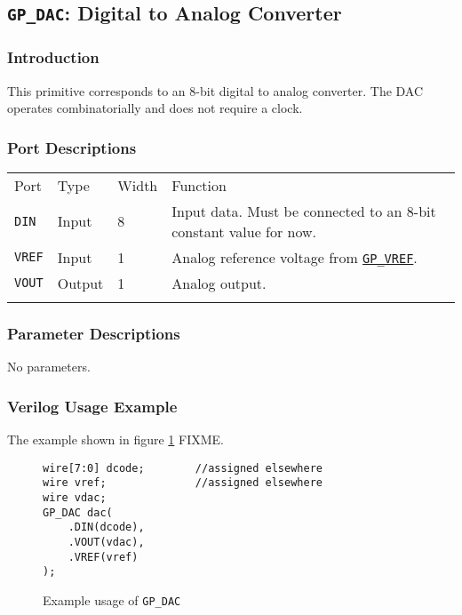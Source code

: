 \documentclass[11pt]{article}
\newcommand{\tokenstyle}[1]{\texttt{#1}}
\newcommand{\whenstyle}[1]{{\fontseries{sb}\selectfont#1}}
\newcommand{\tokenref}[2]{\hyperref[#2]{\tokenstyle{#1}}}
\newcommand{\thinhline}{\Xhline{1\arrayrulewidth}}
\newcommand{\thickhline}{\Xhline{2.5\arrayrulewidth}}
\begin{document}

\pagebreak
\subsection{\tokenstyle{GP\_DAC}: Digital to Analog Converter}
\label{gp-dac}

\subsubsection{Introduction}
This primitive corresponds to an 8-bit digital to analog converter. The DAC operates combinatorially and does not
require a clock.

\subsubsection{Port Descriptions}

\begin{tabularx}{\textwidth}{lllX}
\thinhline
\whenstyle{Port} & \whenstyle{Type} & \whenstyle{Width} & \whenstyle{Function} \\
\thickhline
\tokenstyle{DIN} & Input & 8 & Input data. Must be connected to an 8-bit constant value for now. \\
\thinhline
\tokenstyle{VREF} & Input & 1 & Analog reference voltage from \tokenref{GP\_VREF}{gp-vref}. \\
\thinhline
\tokenstyle{VOUT} & Output & 1 & Analog output. \\
\thinhline
\end{tabularx}

\subsubsection{Parameter Descriptions}

No parameters.

\subsubsection{Verilog Usage Example}

The example shown in figure \ref{gp-dac-example} FIXME.

\begin{figure}[h]
\begin{lstlisting}
wire[7:0] dcode;		//assigned elsewhere
wire vref;				//assigned elsewhere
wire vdac;
GP_DAC dac(
	.DIN(dcode),
	.VOUT(vdac),
	.VREF(vref)
);
\end{lstlisting}
\caption{Example usage of \tokenstyle{GP\_DAC}}
\label{gp-dac-example}
\end{figure}
\end{document}

